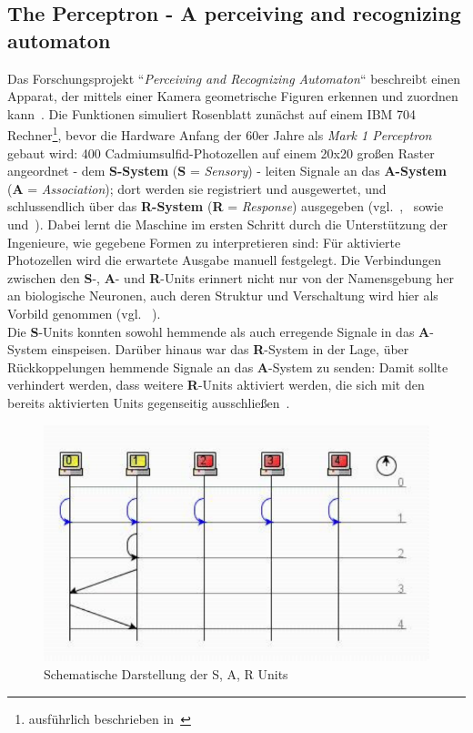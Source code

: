 {\subsection*{The Perceptron - A perceiving and recognizing automaton}
Das Forschungsprojekt ``\textit{Perceiving and Recognizing Automaton}`` beschreibt einen Apparat, der mittels einer Kamera geometrische Figuren erkennen und zuordnen kann~\cite[3]{Ros57}.
Die Funktionen simuliert Rosenblatt zunächst auf einem IBM 704 Rechner\footnote{
    ausführlich beschrieben in~\cite{Ros60}
}, bevor  die Hardware Anfang der 60er Jahre als \textit{Mark 1 Perceptron} gebaut wird: 400 Cadmiumsulfid-Photozellen auf einem 20x20 großen Raster angeordnet - dem \textbf{S-System} (\textbf{S} = \textit{Sensory}) - leiten Signale an das \textbf{A-System} (\textbf{A} = \textit{Association}); dort werden sie registriert und ausgewertet, und schlussendlich über das \textbf{R-System} (\textbf{R} = \textit{Response}) ausgegeben (vgl.~\cite[4 f.]{Ros57},~\cite[389 f.]{Ros58} sowie~\cite[193, ``Frank Rosenblatt]{Bis06} und~\cite[196, Figure 4.8]{Bis06}).
Dabei lernt die Maschine im ersten Schritt durch die Unterstützung der Ingenieure, wie gegebene Formen zu interpretieren sind: Für aktivierte Photozellen wird die erwartete Ausgabe manuell festgelegt.
Die Verbindungen zwischen den \textbf{S}-, \textbf{A}- und \textbf{R}-Units erinnert nicht nur von der Namensgebung her an biologische Neuronen, auch deren Struktur und Verschaltung wird hier als Vorbild genommen (vgl. ~\cite[4]{Ros62}).\\

Die \textbf{S}-Units konnten sowohl hemmende als auch erregende Signale in das \textbf{A}-System einspeisen. Darüber hinaus war das \textbf{R}-System in der Lage, über Rückkoppelungen hemmende Signale an das \textbf{A}-System zu senden: Damit sollte verhindert werden, dass weitere \textbf{R}-Units aktiviert werden, die sich mit den bereits aktivierten Units gegenseitig ausschließen~\cite[4 f.]{Ros57}.



\begin{figure}[h]
    \centering
    \includegraphics{images/p1ReadSeq.pdf}
    \caption{Schematische Darstellung der S, A, R Units}
    \label{fig-sarunits}
\end{figure}


}
